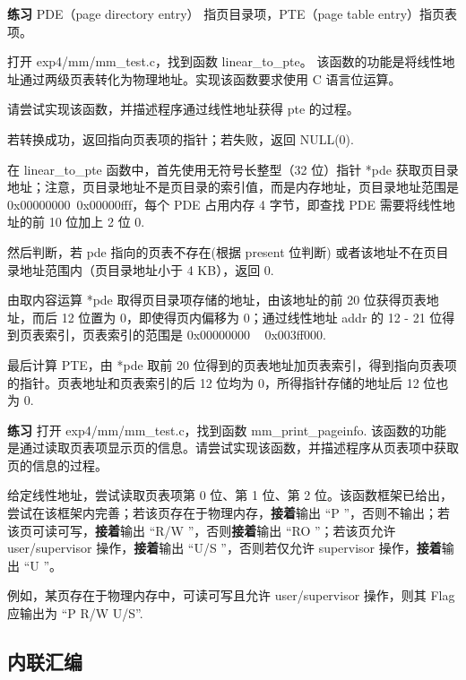 \begin{mdframed}[hidealllines=true,backgroundcolor=gray!20]
\textbf{练习 }PDE（page directory entry） 指页目录项，PTE（page table entry）指页表项。

打开 exp4/mm/mm\_test.c，找到函数 linear\_to\_pte。
该函数的功能是将线性地址通过两级页表转化为物理地址。实现该函数要求使用 C 语言位运算。

请尝试实现该函数，并描述程序通过线性地址获得 pte 的过程。

若转换成功，返回指向页表项的指针；若失败，返回 NULL(0).

在 linear\_to\_pte 函数中，首先使用无符号长整型（32 位）指针 *pde 获取页目录地址；注意，页目录地址不是页目录的索引值，而是内存地址，页目录地址范围是 0x00000000~0x00000fff，每个 PDE 占用内存 4 字节，即查找 PDE 需要将线性地址的前 10 位加上 2 位 0.

然后判断，若 pde 指向的页表不存在(根据 present 位判断) 或者该地址不在页目录地址范围内（页目录地址小于 4 KB），返回 0.

由取内容运算 *pde 取得页目录项存储的地址，由该地址的前 20 位获得页表地址，而后 12 位置为 0，即使得页内偏移为 0；通过线性地址 addr 的 12 - 21 位得到页表索引，页表索引的范围是 0x00000000 ~ 0x003ff000.

最后计算 PTE，由 *pde 取前 20 位得到的页表地址加页表索引，得到指向页表项的指针。页表地址和页表索引的后 12 位均为 0，所得指针存储的地址后 12 位也为 0.
\end{mdframed}

\begin{mdframed}[hidealllines=true,backgroundcolor=gray!20]
\textbf{练习 }打开 exp4/mm/mm\_test.c，找到函数 mm\_print\_pageinfo. 该函数的功能是通过读取页表项显示页的信息。请尝试实现该函数，并描述程序从页表项中获取页的信息的过程。

给定线性地址，尝试读取页表项第 0 位、第 1 位、第 2 位。该函数框架已给出，尝试在该框架内完善；若该页存在于物理内存，\textbf{接着}输出 “P ”，否则不输出；若该页可读可写，\textbf{接着}输出 “R/W ”，否则\textbf{接着}输出 “RO ”；若该页允许 user/supervisor 操作，\textbf{接着}输出 “U/S ”，否则若仅允许 supervisor 操作，\textbf{接着}输出 “U ”。

例如，某页存在于物理内存中，可读可写且允许 user/supervisor 操作，则其 Flag 应输出为 “P R/W U/S”.

\end{mdframed}

\subsection{内联汇编}

